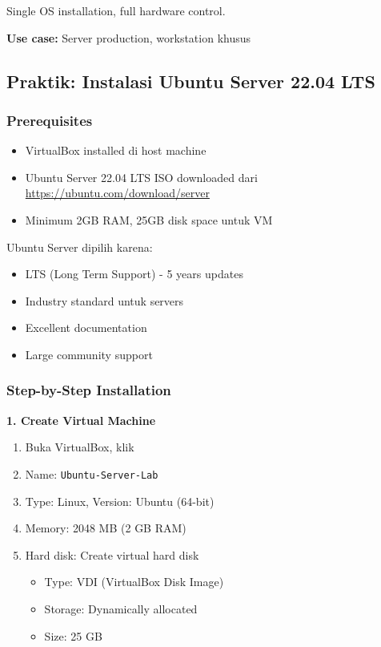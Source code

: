 Single OS installation, full hardware control.

\textbf{Use case:} Server production, workstation khusus

\subsection{Praktik: Instalasi Ubuntu Server 22.04 LTS}

\subsubsection{Prerequisites}

\begin{itemize}
    \item VirtualBox installed di host machine
    \item Ubuntu Server 22.04 LTS ISO downloaded dari \url{https://ubuntu.com/download/server}
    \item Minimum 2GB RAM, 25GB disk space untuk VM
\end{itemize}

\begin{tipbox}
Ubuntu Server dipilih karena:
\begin{itemize}
    \item LTS (Long Term Support) - 5 years updates
    \item Industry standard untuk servers
    \item Excellent documentation
    \item Large community support
\end{itemize}
\end{tipbox}

\subsubsection{Step-by-Step Installation}

\textbf{1. Create Virtual Machine}

\begin{enumerate}
    \item Buka VirtualBox, klik 
    \item Name: \texttt{Ubuntu-Server-Lab}
    \item Type: Linux, Version: Ubuntu (64-bit)
    \item Memory: 2048 MB (2 GB RAM)
    \item Hard disk: Create virtual hard disk
    \begin{itemize}
        \item Type: VDI (VirtualBox Disk Image)
        \item Storage: Dynamically allocated
        \item Size: 25 GB
    \end{itemize}
\end{enumerate}

